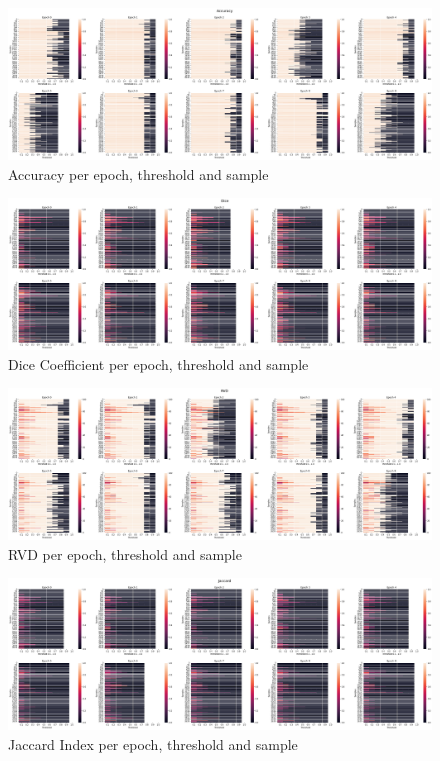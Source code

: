  \begin{figure}[!htbp]
 \centering
 \includegraphics[width=1\linewidth]{PICs/accuracy.png}
 \caption{Accuracy per epoch, threshold and sample}
 \label{fig:accuracy}
 \end{figure}


 \begin{figure}[!htbp]
 \centering
 \includegraphics[width=1\linewidth]{PICs/dice.png}
 \caption{Dice Coefficient per epoch, threshold and sample}
 \label{fig:dice}
 \end{figure}



 \begin{figure}[!htbp]
 \centering
 \includegraphics[width=1\linewidth]{PICs/rvd.png}
 \caption{RVD per epoch, threshold and sample}
 \label{fig:rvd}
 \end{figure}



 \begin{figure}[!htbp]
 \centering
 \includegraphics[width=1\linewidth]{PICs/jaccard.png}
 \caption{Jaccard Index per epoch, threshold and sample}
 \label{fig:accuracy}
 \end{figure}
